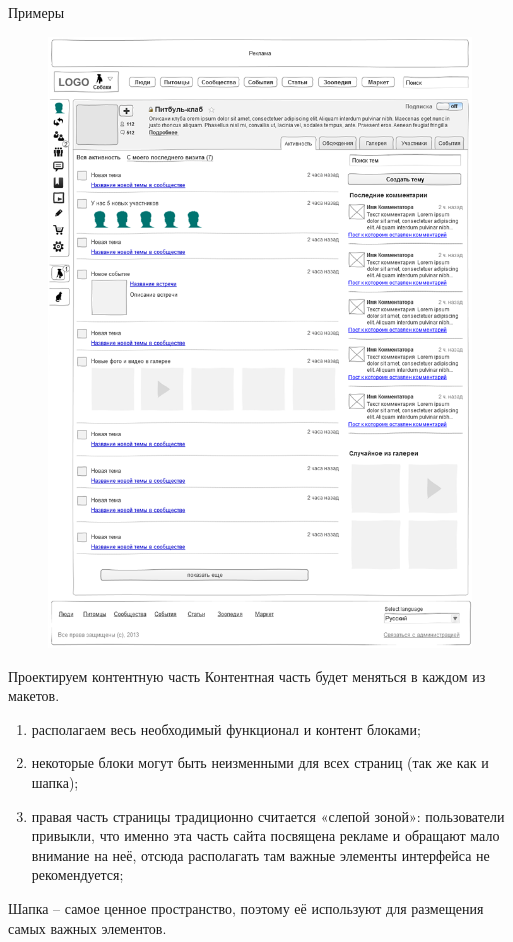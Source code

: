 \documentclass{beamer}
\begin{document}
\begin{frame}[t]{Примеры}
\begin{figure}[h]
\centering
\includegraphics[scale=0.4]{images/SLJ_maket2-sm.png}
\end{figure}
\end{frame}

\begin{frame}[t]{Проектируем контентную часть}
Контентная часть будет меняться в каждом из макетов.
\begin{enumerate}
\item располагаем весь необходимый функционал и контент блоками;
\item некоторые блоки могут быть неизменными для всех страниц (так же как и шапка);
\item правая часть страницы традиционно считается «слепой зоной»: пользователи привыкли, что именно эта часть сайта посвящена рекламе и обращают мало внимание на неё, отсюда располагать там важные элементы интерфейса не рекомендуется;
\end{enumerate}
Шапка – самое ценное пространство, поэтому её используют для размещения самых важных элементов.
\end{frame}
\end{document}
